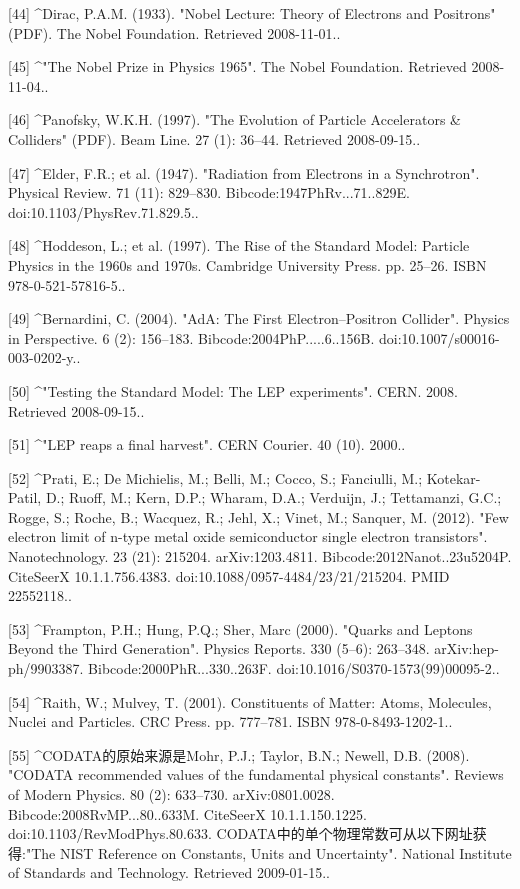 [44]
^Dirac, P.A.M. (1933). "Nobel Lecture: Theory of Electrons and Positrons" (PDF). The Nobel Foundation. Retrieved 2008-11-01..

[45]
^"The Nobel Prize in Physics 1965". The Nobel Foundation. Retrieved 2008-11-04..

[46]
^Panofsky, W.K.H. (1997). "The Evolution of Particle Accelerators & Colliders" (PDF). Beam Line. 27 (1): 36–44. Retrieved 2008-09-15..

[47]
^Elder, F.R.; et al. (1947). "Radiation from Electrons in a Synchrotron". Physical Review. 71 (11): 829–830. Bibcode:1947PhRv...71..829E. doi:10.1103/PhysRev.71.829.5..

[48]
^Hoddeson, L.; et al. (1997). The Rise of the Standard Model: Particle Physics in the 1960s and 1970s. Cambridge University Press. pp. 25–26. ISBN 978-0-521-57816-5..

[49]
^Bernardini, C. (2004). "AdA: The First Electron–Positron Collider". Physics in Perspective. 6 (2): 156–183. Bibcode:2004PhP.....6..156B. doi:10.1007/s00016-003-0202-y..

[50]
^"Testing the Standard Model: The LEP experiments". CERN. 2008. Retrieved 2008-09-15..

[51]
^"LEP reaps a final harvest". CERN Courier. 40 (10). 2000..

[52]
^Prati, E.; De Michielis, M.; Belli, M.; Cocco, S.; Fanciulli, M.; Kotekar-Patil, D.; Ruoff, M.; Kern, D.P.; Wharam, D.A.; Verduijn, J.; Tettamanzi, G.C.; Rogge, S.; Roche, B.; Wacquez, R.; Jehl, X.; Vinet, M.; Sanquer, M. (2012). "Few electron limit of n-type metal oxide semiconductor single electron transistors". Nanotechnology. 23 (21): 215204. arXiv:1203.4811. Bibcode:2012Nanot..23u5204P. CiteSeerX 10.1.1.756.4383. doi:10.1088/0957-4484/23/21/215204. PMID 22552118..

[53]
^Frampton, P.H.; Hung, P.Q.; Sher, Marc (2000). "Quarks and Leptons Beyond the Third Generation". Physics Reports. 330 (5–6): 263–348. arXiv:hep-ph/9903387. Bibcode:2000PhR...330..263F. doi:10.1016/S0370-1573(99)00095-2..

[54]
^Raith, W.; Mulvey, T. (2001). Constituents of Matter: Atoms, Molecules, Nuclei and Particles. CRC Press. pp. 777–781. ISBN 978-0-8493-1202-1..

[55]
^CODATA的原始来源是Mohr, P.J.; Taylor, B.N.; Newell, D.B. (2008). "CODATA recommended values of the fundamental physical constants". Reviews of Modern Physics. 80 (2): 633–730. arXiv:0801.0028. Bibcode:2008RvMP...80..633M. CiteSeerX 10.1.1.150.1225. doi:10.1103/RevModPhys.80.633. CODATA中的单个物理常数可从以下网址获得:"The NIST Reference on Constants, Units and Uncertainty". National Institute of Standards and Technology. Retrieved 2009-01-15..

